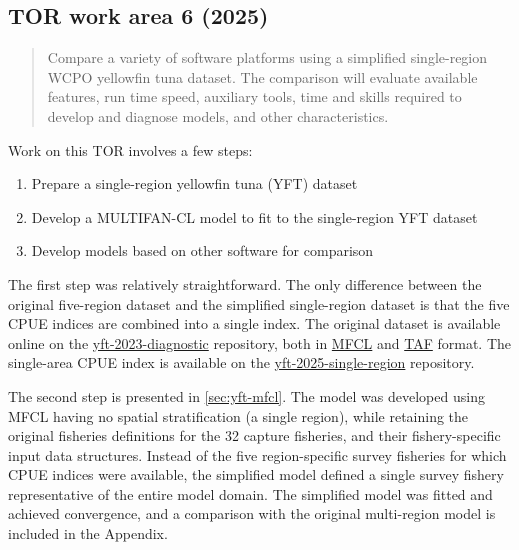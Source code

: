 \documentclass{SCreport}
\newcommand\ofpsam{https://github.com/PacificCommunity/ofp-sam}
\begin{document}
\vspace{2ex}

\hypertarget{link:tor-6}{}
\subsection{TOR work area 6 (2025)}
\label{sec:tor-6}

\begin{quote}\sf
  Compare a variety of software platforms using a simplified single-region WCPO
  yellowfin tuna dataset. The comparison will evaluate available features, run
  time speed, auxiliary tools, time and skills required to develop and diagnose
  models, and other characteristics.
\end{quote}

\vspace{2ex}

Work on this TOR involves a few steps:

\begin{enumerate}
  \item Prepare a single-region yellowfin tuna (YFT) dataset\\[-4.5ex]
  \item Develop a MULTIFAN-CL model to fit to the single-region YFT
  dataset\\[-4.5ex]
  \item Develop models based on other software for comparison
\end{enumerate}

The first step was relatively straightforward. The only difference between the
original five-region dataset and the simplified single-region dataset is that
the five CPUE indices are combined into a single index. The original dataset is
available online on the \href{\ofpsam-yft-2023-diagnostic}{yft-2023-diagnostic}
repository, both in \href{\ofpsam-yft-2023-diagnostic/tree/main/MFCL}{MFCL} and
\href{\ofpsam-yft-2023-diagnostic/tree/main/TAF/data}{TAF} format. The
single-area CPUE index is available on the
\href{\ofpsam-yft-2025-single-region/blob/main/data/cpue/cpue_quarter.csv}
{yft-2025-single-region} repository.

The second step is presented in \autoref{sec:yft-mfcl}. The model was developed
using MFCL having no spatial stratification (a single region), while retaining
the original fisheries definitions for the 32 capture fisheries, and their
fishery-specific input data structures. Instead of the five region-specific
survey fisheries for which CPUE indices were available, the simplified model
defined a single survey fishery representative of the entire model domain. The
simplified model was fitted and achieved convergence, and a comparison with the
original multi-region model is included in the Appendix.
\end{document}
